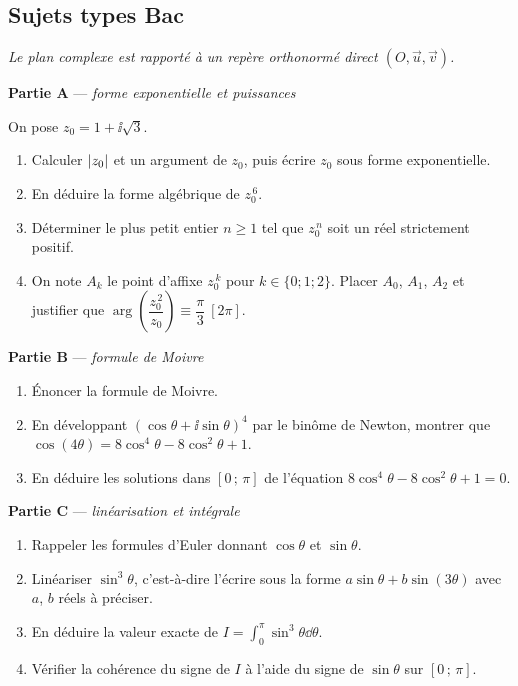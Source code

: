 \subsection{Sujets types Bac}

\emph{Le plan complexe est rapporté à un repère orthonormé direct
$(O, \vec{u}, \vec{v})$.}

\textbf{Partie A} — \textit{forme exponentielle et puissances}

On pose $z_0 = 1 + \ii\sqrt3$.
\begin{enumerate}
	\item Calculer $\left|z_0\right|$ et un argument de $z_0$, puis écrire $z_0$ sous
	forme exponentielle.
	\item En déduire la forme algébrique de $z_0^{\,6}$.
	\item Déterminer le plus petit entier $n \geq 1$ tel que $z_0^{\,n}$ soit
	un réel strictement positif.
	\item On note $A_k$ le point d'affixe $z_0^{\,k}$ pour $k \in \{0;1;2\}$.
	Placer $A_0$, $A_1$, $A_2$ et justifier que
	$\arg\!\left(\dfrac{z_0^{\,2}}{z_0}\right) \equiv \dfrac{\pi}{3}\ [2\pi]$.
\end{enumerate}

\textbf{Partie B} — \textit{formule de Moivre}

\begin{enumerate}
	\item Énoncer la formule de Moivre.
	\item En développant $(\cos\theta + \ii\sin\theta)^4$ par le binôme de
	Newton, montrer que
	$\cos(4\theta) = 8\cos^4\theta - 8\cos^2\theta + 1$.
	\item En déduire les solutions dans $[0\,;\,\pi]$ de l'équation
	$8\cos^4\theta - 8\cos^2\theta + 1 = 0$.
\end{enumerate}

\textbf{Partie C} — \textit{linéarisation et intégrale}

\begin{enumerate}
	\item Rappeler les formules d'Euler donnant $\cos\theta$ et
	$\sin\theta$.
	\item Linéariser $\sin^3\theta$, c'est-à-dire l'écrire sous la forme
	$a\sin\theta + b\sin(3\theta)$ avec $a$, $b$ réels à préciser.
	\item En déduire la valeur exacte de
	$\displaystyle I = \int_0^{\pi}\sin^3\theta\dd\theta$.
	\item Vérifier la cohérence du signe de $I$ à l'aide du signe de
	$\sin\theta$ sur $[0\,;\,\pi]$.
\end{enumerate}

